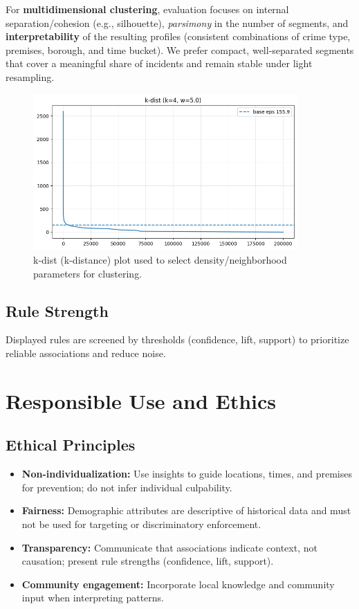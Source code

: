 \documentclass[11pt]{article}
\begin{document}
For \textbf{multidimensional clustering}, evaluation focuses on internal separation/cohesion (e.g., silhouette), \emph{parsimony} in the number of segments, and \textbf{interpretability} of the resulting profiles (consistent combinations of crime type, premises, borough, and time bucket). We prefer compact, well-separated segments that cover a meaningful share of incidents and remain stable under light resampling.

\begin{figure}[H]
  \centering
  \includegraphics[width=0.9\textwidth]{k-dist.png}
  \caption{k-dist (k-distance) plot used to select density/neighborhood parameters for clustering.}
\end{figure}

\subsection{Rule Strength}
Displayed rules are screened by thresholds (confidence, lift, support) to prioritize reliable associations and reduce noise.

\section{Responsible Use and Ethics}

\subsection{Ethical Principles}
\begin{itemize}[leftmargin=*]
  \item \textbf{Non-individualization:} Use insights to guide locations, times, and premises for prevention; do not infer individual culpability.
  \item \textbf{Fairness:} Demographic attributes are descriptive of historical data and must not be used for targeting or discriminatory enforcement.
  \item \textbf{Transparency:} Communicate that associations indicate context, not causation; present rule strengths (confidence, lift, support).
  \item \textbf{Community engagement:} Incorporate local knowledge and community input when interpreting patterns.
\end{itemize}
\end{document}
